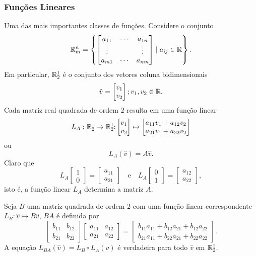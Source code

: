 \subsubsection{Funções Lineares}
Uma das mais importantes classes de funções. Considere o conjunto 
$$ \mathbb{R}_{m}^{n} = \left\{
  \begin{bmatrix}
    a_{11} & \cdots & a_{1n} \\
    \vdots &  & \vdots \\
    a_{m1} & \cdots & a_{mn}
  \end{bmatrix}
\mid a_{ij} \in \mathbb{R} \right\}.$$
Em particular, $\mathbb{R}_{2}^{1}$ é o conjunto dos vetores coluna bidimensionais 
$$\hat{v} = \begin{bmatrix}
  v_{1} \\
  v_{2}
\end{bmatrix}; v_{1}, v_{2} \in \mathbb{R}.$$
Cada matriz real quadrada de ordem $2$ resulta em uma função linear
$$ L_{A}:\mathbb{R}_{2}^{1} \to \mathbb{R}_{2}^{1}; \begin{bmatrix}
  v_{1} \\
  v_{2}
\end{bmatrix}
\mapsto 
\begin{bmatrix}
  a_{11}v_{1} + a_{12}v_{2} \\
  a_{21}v_{1} + a_{22}v_{2}
\end{bmatrix}$$
ou $$L_{A}\left(\hat{v}\right) = A\hat{v}.$$
Claro que $$L_{A} \begin{bmatrix}
  1 \\
  0
\end{bmatrix} =
\begin{bmatrix}
  a_{11} \\
  a_{21}
\end{bmatrix} \quad \textrm{e} \quad
L_{A} \begin{bmatrix}
  0 \\
  1
\end{bmatrix} =
\begin{bmatrix}
  a_{12} \\
  a_{22}
\end{bmatrix},$$
isto é, a função linear $L_{A}$ determina a matriz $A$.

Seja $B$ uma matriz quadrada de ordem $2$ com uma função linear correspondente $L_{B}: \hat{v}\mapsto B\hat{v}$, $BA$ é definida por
$$\begin{bmatrix}
  b_{11} & b_{12} \\
  b_{21} & b_{22}
\end{bmatrix}
\begin{bmatrix}
  a_{11} & a_{12} \\
  a_{21} & a_{22}
\end{bmatrix} = 
\begin{bmatrix}
  b_{11}a_{11} + b_{12}a_{21} + b_{12}a_{22} \\
  b_{21}a_{11} + b_{22}a_{21} + b_{22}a_{22}
\end{bmatrix}.$$
A equação $L_{BA} (\hat{v}) = L_{B} \circ L_{A} (\hat{v})$ é verdadeira para todo $\hat{v}$ em $\mathbb{R}_{2}^{1}$. 

